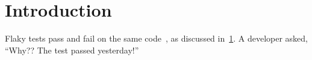 \documentclass{article}
\begin{document}
\section{Introduction}\label{sec:intro}
Flaky tests pass and fail on the same code~\cite{luo2014}, as discussed in~\ref{sec:intro}.
A developer asked, ``Why?? The test passed yesterday!''


\end{document}
